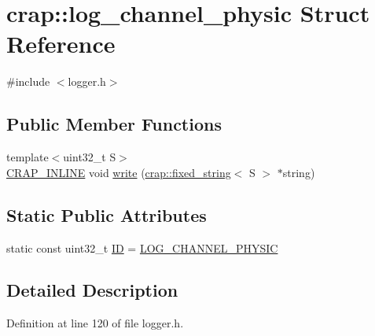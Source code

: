 \hypertarget{structcrap_1_1log__channel__physic}{\section{crap\+:\+:log\+\_\+channel\+\_\+physic Struct Reference}
\label{structcrap_1_1log__channel__physic}
}


{\ttfamily \#include $<$logger.\+h$>$}

\subsection*{Public Member Functions}
\begin{DoxyCompactItemize}
\item 
{\footnotesize template$<$uint32\+\_\+t S$>$ }\\\hyperlink{config__x86_8h_a5a40526b8d842e7ff731509998bb0f1c}{C\+R\+A\+P\+\_\+\+I\+N\+L\+I\+N\+E} void \hyperlink{structcrap_1_1log__channel__physic_a2115c53dd4af1cddcc5594cbc42fafe7}{write} (\hyperlink{classcrap_1_1fixed__string}{crap\+::fixed\+\_\+string}$<$ S $>$ $\ast$string)
\end{DoxyCompactItemize}
\subsection*{Static Public Attributes}
\begin{DoxyCompactItemize}
\item 
static const uint32\+\_\+t \hyperlink{structcrap_1_1log__channel__physic_a3575423520f3ac125ee632a7408c06f7}{I\+D} = \hyperlink{logger_8h_a68deb1abc6a9c11b2ec7553cf6d47bf0}{L\+O\+G\+\_\+\+C\+H\+A\+N\+N\+E\+L\+\_\+\+P\+H\+Y\+S\+I\+C}
\end{DoxyCompactItemize}


\subsection{Detailed Description}


Definition at line 120 of file logger.\+h.




